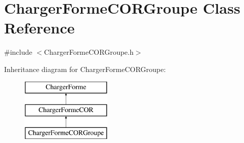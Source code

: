 \hypertarget{class_charger_forme_c_o_r_groupe}{}\section{Charger\+Forme\+C\+O\+R\+Groupe Class Reference}
\label{class_charger_forme_c_o_r_groupe}


{\ttfamily \#include $<$Charger\+Forme\+C\+O\+R\+Groupe.\+h$>$}

Inheritance diagram for Charger\+Forme\+C\+O\+R\+Groupe\+:\begin{figure}[H]
\begin{center}
\leavevmode
\includegraphics[height=3.000000cm]{class_charger_forme_c_o_r_groupe}
\end{center}
\end{figure}
